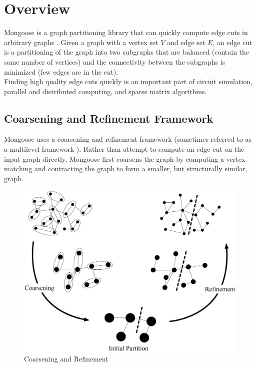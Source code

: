 \documentclass[letter]{article}
\begin{document}
\maketitle

\tableofcontents

\newpage

\section{Overview}
Mongoose is a graph partitioning library that can quickly compute edge cuts in arbitrary graphs \cite{MongooseTOMS}. Given a graph with a vertex set $V$ and edge set $E$, an edge cut is a partitioning of the graph into two subgraphs that are balanced (contain the same number of vertices) and the connectivity between the subgraphs is minimized (few edges are in the cut).
\\

Finding high quality edge cuts quickly is an important part of circuit simulation, parallel and distributed computing, and sparse matrix algorithms.

\subsection{Coarsening and Refinement Framework}

Mongoose uses a coarsening and refinement framework (sometimes referred to as a multilevel framework \cite{HendricksonLeland1995, KarypisKumar1995}). Rather than attempt to compute an edge cut on the input graph directly, Mongoose first coarsens the graph by computing a vertex matching and contracting the graph to form a smaller, but structurally similar, graph.

\begin{figure}[!ht] 
\begin{center} 
    \includegraphics[scale=0.18]{Figures/MultilevelOverview.eps} 
    \caption{Coarsening and Refinement} 
\end{center} 
\end{figure} 
\end{document}
